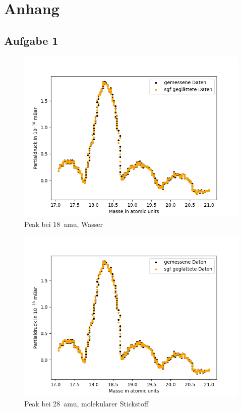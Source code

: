 \chapter{Anhang}
\section{Aufgabe 1}
\begin{figure}
    \centering
    \includegraphics[width=140mm,scale=0.8]{Massenspektrometer/include/MSm18Wasser.png}
    \caption{Peak bei \SI{18}{amu}, Wasser}
    \label{fig:MSWasserPeak}
\end{figure}
\begin{figure}
    \centering
    \includegraphics[width=140mm,scale=0.8]{Massenspektrometer/include/MSm18Wasser.png}
    \caption{Peak bei \SI{28}{amu}, molekularer Stickstoff}
    \label{fig:MSN2Peak}
\end{figure}
